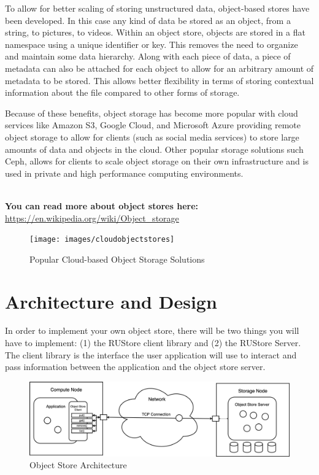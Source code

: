 \documentclass{article}
\begin{document}
To allow for better scaling of storing unstructured data, object-based stores have been developed. In this case any kind of data be stored as an object, from a string, to pictures, to videos. Within an object store, objects are stored in a flat namespace using a unique identifier or key. This removes the need to organize and maintain some data hierarchy. Along with each piece of data, a piece of metadata can also be attached for each object to allow for an arbitrary amount of metadata to be stored. This allows better flexibility in terms of storing contextual information about the file compared to other forms of storage.  

Because of these benefits, object storage has become more popular with cloud services like Amazon S3, Google Cloud, and Microsoft Azure providing remote object storage to allow for clients (such as social media services) to store large amounts of data and objects in the cloud. Other popular storage solutions such Ceph, allows for clients to scale object storage on their own infrastructure and is used in private and high performance computing environments. 

\-\ \\ \noindent \textbf{You can read more about object stores here:}
\href{https://en.wikipedia.org/wiki/Object_storage}{https://en.wikipedia.org/wiki/Object\_storage}

\begin{figure}[hbt!]
\vspace{-0.0cm}
\texttt{[image: images/cloudobjectstores]}
\centering
\caption{Popular Cloud-based Object Storage Solutions}
\end{figure}



\section{Architecture and Design}

In order to implement your own object store, there will be two things you will have to implement: (1) the RUStore client library and (2) the RUStore Server. The client library is the interface the user application will use to interact and pass information between the application and the object store server. 

\begin{figure}[h]
\vspace{0.2cm}
\includegraphics[width=16cm]{images/objectstore.png}
\centering
\caption{Object Store Architecture}
\vspace{-0.3cm}
\end{figure}
\end{document}
